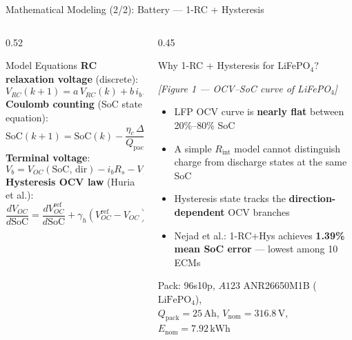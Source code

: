 \documentclass[aspectratio=169, 10pt]{beamer}
\newcommand{\SoC}{\mathrm{SoC}}
\newcommand{\highlight}[1]{\textcolor{fcgold!80!black}{\textbf{#1}}}
\begin{document}
\begin{frame}{Mathematical Modeling (2/2): Battery — 1-RC + Hysteresis}
  \begin{columns}[T]
    \begin{column}{0.52\textwidth}
      \begin{block}{Model Equations}
        \textbf{RC relaxation voltage} (discrete):
        \[
          V_{RC}(k\!+\!1) = a\,V_{RC}(k) + b\,i_b, \quad
          a = e^{-\Delta t/\tau_1},\; b = R_1(1-a)
        \]
        \textbf{Coulomb counting} (SoC state equation):
        \[
          \SoC(k\!+\!1) = \SoC(k) - \frac{\eta_c\,\Delta t}{Q_{\mathrm{pack}}}\,i_b
        \]
        \textbf{Terminal voltage}:
        \[
          V_b = V_{OC}(\SoC,\,\mathrm{dir}) - i_b R_s - V_{RC}
        \]
        \textbf{Hysteresis OCV law} (Huria et al.):
        \[
          \frac{dV_{OC}}{d\SoC} = \frac{dV_{OC}^{\mathrm{ref}}}{d\SoC}
                                  + \gamma_h(V_{OC}^{\mathrm{ref}} - V_{OC})
        \]
      \end{block}
    \end{column}
    \begin{column}{0.45\textwidth}
      \begin{alertblock}{Why 1-RC + Hysteresis for LiFePO$_4$?}
        \begin{center}
          \textit{[Figure 1 — OCV–SoC curve of LiFePO$_4$]}
        \end{center}
        \vspace{4pt}
        \begin{itemize}
          \item LFP OCV curve is \highlight{nearly flat} between 20\%–80\% SoC
          \item A simple $R_{\mathrm{int}}$ model cannot distinguish charge from discharge states at the same SoC
          \item Hysteresis state tracks the \textbf{direction-dependent} OCV branches
          \item Nejad et al.: 1-RC+Hys achieves \highlight{1.39\% mean SoC error} — lowest among 10 ECMs
        \end{itemize}
        \vspace{4pt}
        Pack: 96s10p, $A123$ ANR26650M1B ($\mathrm{LiFePO_4}$),\\
        $Q_{\mathrm{pack}} = 25\,\text{Ah}$, $V_{\mathrm{nom}} = 316.8\,\text{V}$,\\
        $E_{\mathrm{nom}} = 7.92\,\text{kWh}$
      \end{alertblock}
    \end{column}
  \end{columns}
\end{frame}
\end{document}
